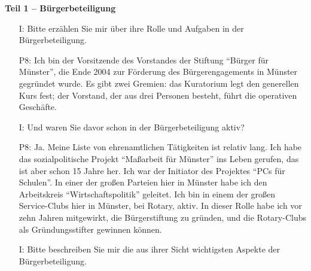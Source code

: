 \textbf{Teil 1 -- B{\"u}rgerbeteiligung}
\begin{itemize}
    \item[I:] Bitte erz{\"a}hlen Sie mir {\"u}ber ihre Rolle und Aufgaben in der B{\"u}rgerbeteiligung.
    \item[P8:] Ich bin der Vorsitzende des Vorstandes der Stiftung "`B{\"u}rger f{\"u}r M{\"u}nster"', die Ende 2004 zur F{\"o}rderung des B{\"u}rgerengagements in M{\"u}nster gegr{\"u}ndet wurde. Es gibt zwei Gremien: das Kuratorium legt den generellen Kurs fest; der Vorstand, der aus drei Personen besteht, f{\"u}hrt die operativen Gesch{\"a}fte.
    \item[I:] Und waren Sie davor schon in der B{\"u}rgerbeteiligung aktiv?
    \item[P8:] Ja. Meine Liste von ehrenamtlichen T{\"a}tigkeiten ist relativ lang. Ich habe das sozialpolitische Projekt "`Ma{\ss}arbeit f{\"u}r M{\"u}nster"' ins Leben gerufen, das ist aber schon 15 Jahre her. Ich war der Initiator des Projektes "`PCs f{\"u}r Schulen"'. In einer der gro{\ss}en Parteien hier in M{\"u}nster habe ich den Arbeitskreis "`Wirtschaftspolitik"' geleitet. Ich bin in einem der gro{\ss}en Service-Clubs hier in M{\"u}nster, bei Rotary, aktiv. In dieser Rolle habe ich vor zehn Jahren mitgewirkt, die B{\"u}rgerstiftung zu gr{\"u}nden, und die Rotary-Clubs als Gr{\"u}ndungsstifter gewinnen k{\"o}nnen.
    \item[I:] Bitte beschreiben Sie mir die aus ihrer Sicht wichtigsten Aspekte der B{\"u}rgerbeteiligung.

\end{itemize}
